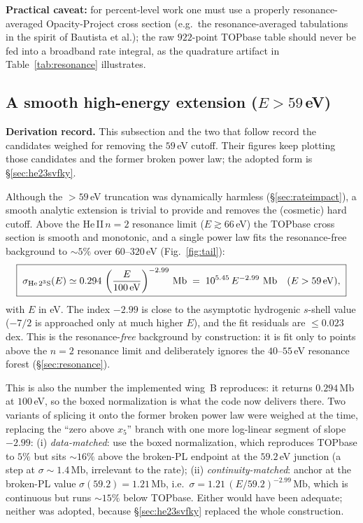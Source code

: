 \documentclass[english,a4paper]{my_memo}
\newcommand{\Mb}{\mathrm{Mb}}
\newcommand{\sig}{\sigma}
\begin{document}
\textbf{Practical caveat:} for percent-level work one must use a properly
resonance-averaged Opacity-Project cross section (e.g.\ the
resonance-averaged tabulations in the spirit of Bautista et al.); the raw
$922$-point TOPbase table should never be fed into a broadband rate
integral, as the quadrature artifact in Table~\ref{tab:resonance}
illustrates.

\subsection{A smooth high-energy extension ($E>59\,$eV)}
\label{sec:tail}

\textbf{Derivation record.} This subsection and the two that follow record the
candidates weighed for removing the $59\,$eV cutoff. Their figures keep
plotting those candidates and the former broken power law; the adopted form is
\S\ref{sec:he23svfky}.

Although the $>59\,$eV truncation was dynamically harmless
(\S\ref{sec:rateimpact}), a smooth analytic extension is trivial to
provide and removes the (cosmetic) hard cutoff. Above the He\,II\,$n=2$
resonance limit ($E\gtrsim66\,$eV) the TOPbase cross section is smooth and
monotonic, and a single power law fits the resonance-free background to
$\sim$$5\%$ over $60$--$320\,$eV (Fig.~\ref{fig:tail}):
\begin{equation}
\boxed{\;\sig_{\rm He\,2^3S}(E) \simeq 0.294\,
   \left(\frac{E}{100\,\text{eV}}\right)^{-2.99}\,\Mb
   \;=\; 10^{5.45}\,E^{-2.99}\ \Mb \quad (E>59\,\text{eV}),\;}
\end{equation}
with $E$ in eV. The index $-2.99$ is close to the asymptotic hydrogenic
$s$-shell value ($-7/2$ is approached only at much higher $E$), and the
fit residuals are $\le0.023\,$dex. This is the resonance-\emph{free}
background by construction: it is fit only to points above the $n=2$
resonance limit and deliberately ignores the $40$--$55\,$eV resonance
forest (\S\ref{sec:resonance}).

This is also the number the implemented wing~B reproduces: it returns
$0.294\,\Mb$ at $100\,$eV, so the boxed normalization is what the code now
delivers there. Two variants of splicing it onto the former broken power law
were weighed at the time, replacing the ``zero above $x_5$'' branch with one
more log-linear segment of slope $-2.99$:
(i) \emph{data-matched}: use the boxed normalization, which reproduces
TOPbase to $5\%$ but sits $\sim$$16\%$ above the broken-PL endpoint at the
$59.2\,$eV junction (a step at $\sig\sim1.4\,\Mb$, irrelevant to the rate);
(ii) \emph{continuity-matched}: anchor at the broken-PL value
$\sig(59.2)=1.21\,\Mb$, i.e.\ $\sig=1.21\,(E/59.2)^{-2.99}\,\Mb$, which is
continuous but runs $\sim$$15\%$ below TOPbase. Either would have been adequate; neither was adopted, because
\S\ref{sec:he23svfky} replaced the whole construction.
\end{document}
